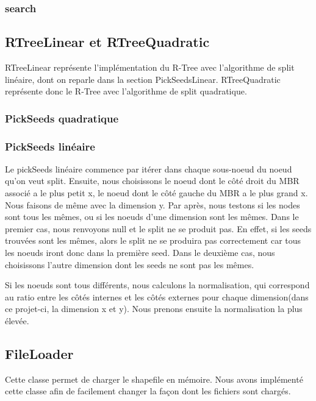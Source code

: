 \documentclass[utf8]{article}
\begin{document}
\begin{large}
  \par
  \subsubsection{search}
  \par
  \indent


  \par
  \subsection{RTreeLinear et RTreeQuadratic}\label{RTreeLinear}
  \par
  \indent
  RTreeLinear représente l'implémentation du R-Tree avec l'algorithme de split
  linéaire, dont on reparle dans la section PickSeedsLinear. RTreeQuadratic
  représente donc le R-Tree avec l'algorithme de split quadratique.

  \subsubsection{PickSeeds quadratique}
  \subsubsection{PickSeeds linéaire}
  \par
  \indent
  Le pickSeeds linéaire commence par itérer dans chaque sous-noeud du noeud
  qu'on veut split. Ensuite, nous choisissons le noeud dont le côté droit du MBR
  associé a le plus petit x, le noeud dont le côté gauche du MBR a le plus grand
  x. Nous faisons de même avec la dimension y. Par après, nous testons si les
  nodes sont tous les mêmes, ou si les noeuds d'une dimension sont les mêmes.
  Dans le premier cas, nous renvoyons null et le split ne se produit pas. En
  effet, si les seeds trouvées sont les mêmes, alors le split ne se produira pas
  correctement car tous les noeuds iront donc dans la première seed. Dans le
  deuxième cas, nous choisissons l'autre dimension dont les seeds ne sont pas
  les mêmes.
  \par
  \indent
  Si les noeuds sont tous différents, nous calculons la normalisation, qui
  correspond au ratio entre les côtés internes et les côtés externes pour chaque
  dimension(dans ce projet-ci, la dimension x et y). Nous prenons ensuite la
  normalisation la plus élevée.
  \par

  \subsection{FileLoader}
  \par
  \indent
  Cette classe permet de charger le shapefile en mémoire. Nous avons implémenté
  cette classe afin de facilement changer la façon dont les fichiers sont chargés.



\end{large}
\end{document}
